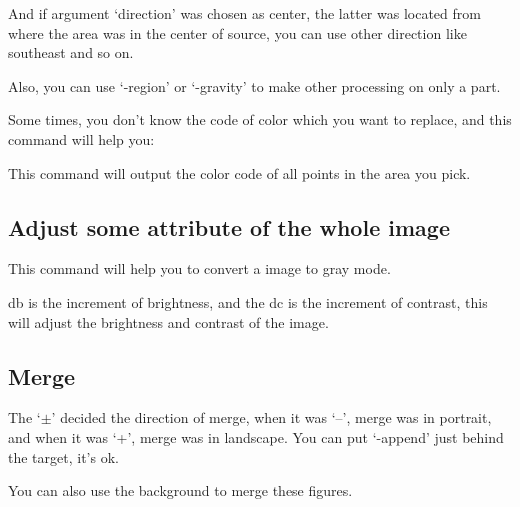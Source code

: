 \documentclass[12pt]{article}
\begin{document}
And if argument `direction' was chosen as center, the latter was located from where the area was in the center of source, you can use other direction like southeast and so on.

Also, you can use `-region' or `-gravity' to make other processing on only a part.

Some times, you don't know the code of color which you want to replace, and this command will help you:\vspace{5mm}

{\centering{}\par}\vspace{5mm}

This command will output the color code of all points in the area you pick.\vspace{5mm}

\subsection{Adjust some attribute of the whole image}

{\centering{}\par}\vspace{5mm}

This command will help you to convert a image to gray mode.\vspace{5mm}

{\centering{}\par}\vspace{5mm}

db is the increment of brightness, and the dc is the increment of contrast, this will adjust the brightness and contrast of the image.
\subsection{Merge}
{\centering{}\par}\vspace{5mm}

The `$\pm$' decided the direction of merge, when it was `\---', merge was in portrait, and when it was `+', merge was in landscape. You can put `-append' just behind the target, it's ok.

You can also use the background to merge these figures.
\end{document}
